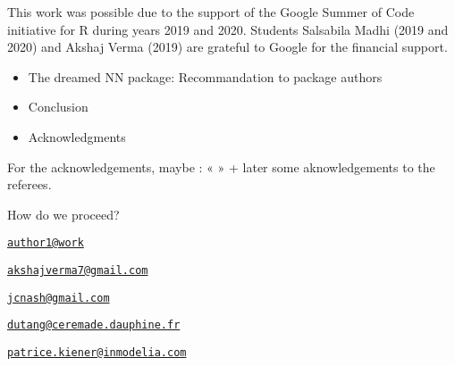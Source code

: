 This work was possible due to the support of the Google Summer of Code
initiative for R during years 2019 and 2020. Students Salsabila Madhi
(2019 and 2020) and Akshaj Verma (2019) are grateful to Google for the
financial support.



\begin{itemize}
\tightlist
\item
  The dreamed NN package: Recommandation to package authors
\item
  Conclusion
\item
  Acknowledgments
\end{itemize}

For the acknowledgements, maybe : « » + later some aknowledgements to
the referees.

How do we proceed?


\address{%
Salsabila Mahdi\\
Affiliation\\
line 1\\ line 2\\
}
\href{mailto:author1@work}{\nolinkurl{author1@work}}

\address{%
Akshaj Verma\\
Affiliation\\
line 1\\ line 2\\
}
\href{mailto:akshajverma7@gmail.com}{\nolinkurl{akshajverma7@gmail.com}}

\address{%
John C. Nash\\
Affiliation\\
line 1\\ line 2\\
}
\href{mailto:jcnash@gmail.com}{\nolinkurl{jcnash@gmail.com}}

\address{%
Christophe Dutang\\
University of Paris-Dauphine\\
line 1\\ line 2\\
}
\href{mailto:dutang@ceremade.dauphine.fr}{\nolinkurl{dutang@ceremade.dauphine.fr}}

\address{%
Patrice Kiener\\
InModelia\\
5 rue Malebranche, 75005 Paris, France\\
}
\href{mailto:patrice.kiener@inmodelia.com}{\nolinkurl{patrice.kiener@inmodelia.com}}
